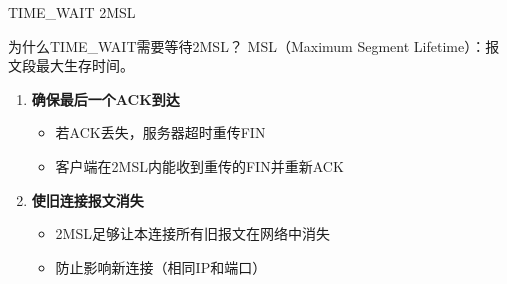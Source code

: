 \documentclass[10pt, aspectratio=169]{beamer}
\begin{document}
\begin{frame}{TIME\_WAIT 2MSL}
    \begin{block}{为什么TIME\_WAIT需要等待2MSL？}
        MSL（Maximum Segment Lifetime）：报文段最大生存时间。
    \end{block}
    \vspace{0.3em}
    \begin{enumerate}
        \item \textbf{确保最后一个ACK到达}
        \begin{itemize}
            \item 若ACK丢失，服务器超时重传FIN
            \item 客户端在2MSL内能收到重传的FIN并重新ACK
        \end{itemize}
        \item \textbf{使旧连接报文消失}
        \begin{itemize}
            \item 2MSL足够让本连接所有旧报文在网络中消失
            \item 防止影响新连接（相同IP和端口）
        \end{itemize}
    \end{enumerate}
    \vspace{0.5em}
    \begin{center}
    \end{center}
\end{frame}
\end{document}
